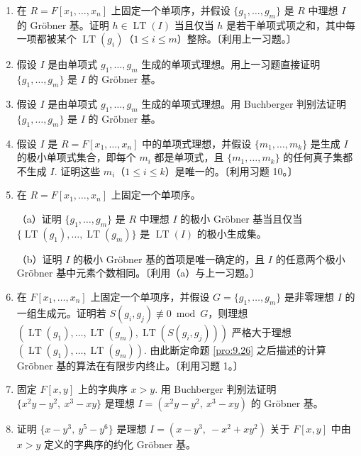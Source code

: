 \begin{enumerate}
\item 在 \(R = F[x_1, \ldots, x_n]\) 上固定一个单项序，并假设 \(\{g_1, \ldots, g_m\}\) 是 \(R\) 中理想 \(I\) 的 Gröbner 基。证明 \(h \in \operatorname{LT}(I)\) 当且仅当 \(h\) 是若干单项式项之和，其中每一项都被某个 \(\operatorname{LT}(g_i)\)（\(1 \leq i \leq m\)）整除。〔利用上一习题。〕

\item 假设 \(I\) 是由单项式 \(g_1, \ldots, g_m\) 生成的单项式理想。用上一习题直接证明 \(\{g_1, \ldots, g_m\}\) 是 \(I\) 的 Gröbner 基。

\item 假设 \(I\) 是由单项式 \(g_1, \ldots, g_m\) 生成的单项式理想。用 Buchberger 判别法证明 \(\{g_1, \ldots, g_m\}\) 是 \(I\) 的 Gröbner 基。

\item 假设 \(I\) 是 \(R = F[x_1, \ldots, x_n]\) 中的单项式理想，并假设 \(\{m_1, \ldots, m_k\}\) 是生成 \(I\) 的极小单项式集合，即每个 \(m_i\) 都是单项式，且 \(\{m_1, \ldots, m_k\}\) 的任何真子集都不生成 \(I\). 证明这些 \(m_i\)（\(1 \leq i \leq k\)）是唯一的。〔利用习题 10。〕

\item 在 \(R = F[x_1, \ldots, x_n]\) 上固定一个单项序。

（a）证明 \(\{g_1, \ldots, g_m\}\) 是 \(R\) 中理想 \(I\) 的极小 Gröbner 基当且仅当 \(\{\operatorname{LT}(g_1), \ldots, \operatorname{LT}(g_m)\}\) 是 \(\operatorname{LT}(I)\) 的极小生成集。

（b）证明 \(I\) 的极小 Gröbner 基的首项是唯一确定的，且 \(I\) 的任意两个极小 Gröbner 基中元素个数相同。〔利用（a）与上一习题。〕

\item 在 \(F[x_1, \ldots, x_n]\) 上固定一个单项序，并假设 \(G = \{g_1, \ldots, g_m\}\) 是非零理想 \(I\) 的一组生成元。证明若 \(S(g_i, g_j) \not\equiv 0 \bmod G\)，则理想 \((\operatorname{LT}(g_1), \ldots, \operatorname{LT}(g_m), \operatorname{LT}(S(g_i, g_j)))\) 严格大于理想 \((\operatorname{LT}(g_1), \ldots, \operatorname{LT}(g_m))\). 由此断定命题 \ref{pro:9.26} 之后描述的计算 Gröbner 基的算法在有限步内终止。〔利用习题 1。〕

\item 固定 \(F[x, y]\) 上的字典序 \(x > y\). 用 Buchberger 判别法证明 \(\{x^2y-y^2,\ x^3-xy\}\) 是理想 \(I = (x^2y-y^2,\ x^3-xy)\) 的 Gröbner 基。

\item 证明 \(\{x-y^3,\ y^5-y^6\}\) 是理想 \(I = (x-y^3,\ -x^2+xy^2)\) 关于 \(F[x, y]\) 中由 \(x > y\) 定义的字典序的约化 Gröbner 基。


\end{enumerate}
